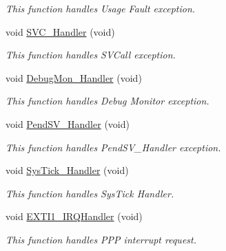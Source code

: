 \begin{DoxyCompactItemize}
\begin{DoxyCompactList}\small\item\em This function handles Usage Fault exception. \end{DoxyCompactList}\item 
void \hyperlink{group___p_w_r___s_t_a_n_d_b_y_ga3e5ddb3df0d62f2dc357e64a3f04a6ce}{S\-V\-C\-\_\-\-Handler} (void)
\begin{DoxyCompactList}\small\item\em This function handles S\-V\-Call exception. \end{DoxyCompactList}\item 
void \hyperlink{group___p_w_r___s_t_a_n_d_b_y_gadbdfb05858cc36fc520974df37ec3cb0}{Debug\-Mon\-\_\-\-Handler} (void)
\begin{DoxyCompactList}\small\item\em This function handles Debug Monitor exception. \end{DoxyCompactList}\item 
void \hyperlink{group___p_w_r___s_t_a_n_d_b_y_ga6303e1f258cbdc1f970ce579cc015623}{Pend\-S\-V\-\_\-\-Handler} (void)
\begin{DoxyCompactList}\small\item\em This function handles Pend\-S\-V\-\_\-\-Handler exception. \end{DoxyCompactList}\item 
void \hyperlink{group___p_w_r___s_t_a_n_d_b_y_gab5e09814056d617c521549e542639b7e}{Sys\-Tick\-\_\-\-Handler} (void)
\begin{DoxyCompactList}\small\item\em This function handles Sys\-Tick Handler. \end{DoxyCompactList}\item 
void \hyperlink{group___p_w_r___s_t_a_n_d_b_y_ga49cfdd46eb8d0ef3e1987514aa9343dc}{E\-X\-T\-I1\-\_\-\-I\-R\-Q\-Handler} (void)
\begin{DoxyCompactList}\small\item\em This function handles P\-P\-P interrupt request. \end{DoxyCompactList}\end{DoxyCompactItemize}
